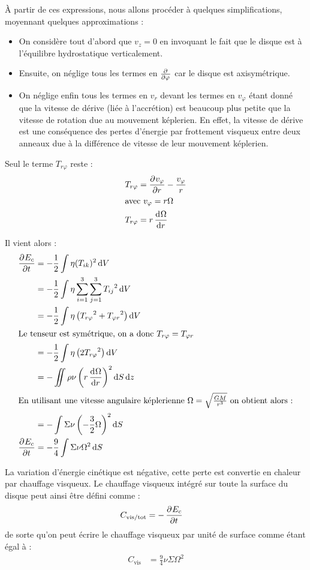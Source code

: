 À partir de ces expressions, nous allons procéder à quelques simplifications, moyennant quelques approximations : 
\begin{itemize}
\item On considère tout d'abord que $v_z=0$ en invoquant le fait que le disque est à l'équilibre hydrostatique verticalement. 

\item Ensuite, on néglige tous les termes en $\pd{}{\varphi}$ car le disque est axisymétrique. 

\item On néglige enfin tous les termes en $v_r$ devant les termes en $v_\varphi$ étant donné que la vitesse de dérive (liée à l'accrétion) est beaucoup plus petite que la vitesse de rotation due au mouvement képlerien. En effet, la vitesse de dérive est une conséquence des pertes d'énergie par frottement visqueux entre deux anneaux due à la différence de vitesse de leur mouvement képlerien.
\end{itemize}

Seul le terme $T_{r\varphi}$ reste :
\begin{align}
T_{r\varphi} &= \dpd{v_\varphi}{r} - \frac{v_\varphi}{r}\nonumber\\
\intertext{avec $v_\varphi=r\Omega$}
T_{r\varphi} &= r\dod{\Omega}{r}
\end{align}

Il vient alors :
\begin{align*}
\dpd{E_c}{t} &= - \frac{1}{2}\int \eta(T_{ik})^2\dif V\\
&= - \frac{1}{2}\int \eta\sum_{i=1}^3\sum_{j=1}^3 {T_{ij}}^2\dif V\\
&= - \frac{1}{2}\int \eta\left({T_{r\varphi}}^2+{T_{\varphi r}}^2\right)\dif V\\
\intertext{Le tenseur est symétrique, on a donc $T_{r\varphi} = T_{\varphi r}$}
&= - \frac{1}{2}\int \eta\left(2{T_{r\varphi}}^2\right)\dif V\\
&= - \iint \rho\nu \left(r\dod{\Omega}{r}\right)^2\dif S\dif z\\
\intertext{En utilisant une vitesse angulaire képlerienne $\Omega=\sqrt{\frac{GM}{r^3}}$ on obtient alors :}
&= - \int \Sigma\nu \left(-\frac{3}{2}\Omega\right)^2\dif S\\
\dpd{E_c}{t} &= - \frac{9}{4} \int \Sigma\nu \Omega^2\dif S
\end{align*}

La variation d'énergie cinétique est négative, cette perte est convertie en chaleur par chauffage visqueux. Le chauffage visqueux intégré sur toute la surface du disque peut ainsi être défini comme : 
\begin{align*}
C_\text{vis/tot} &= - \mathinner{ \dfrac{\partial{^{}}E_c}{\partial{{t}^{}}} }
\end{align*}
de sorte qu'on peut écrire le chauffage visqueux par unité de surface comme étant égal à :
\begin{align}
C_\text{vis} &= \frac{9}{4} \nu\Sigma\Omega^2
\end{align}

